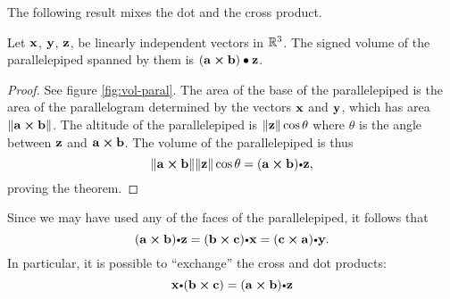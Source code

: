 The following result mixes the dot and the cross product.

\begin{thm}\label{thm:vol-parallelepiped}
Let $\mathbf{ x}$, $\mathbf{ y}$, $\mathbf{ z}$, be linearly
independent vectors in $\mathbb{R}^3$. The signed volume of the
parallelepiped spanned by them is $(\mathbf{ a}\boldsymbol\times\mathbf{ b})\bullet
\mathbf{ z}$.
\end{thm}
\begin{proof}
See figure \ref{fig:vol-paral}. The area of the base of the
parallelepiped is  the area of the parallelogram determined by the
vectors $\mathbf{ x}$ and  $\mathbf{ y}$, which has area
${\left\|\mathbf{ a}\boldsymbol\times\mathbf{ b}\right\|}$. The altitude of the parallelepiped is
${\left\|\mathbf{ z}\right\|}\cos\theta$ where $\theta$ is the angle between
$\mathbf{ z}$ and $\mathbf{ a}\boldsymbol\times\mathbf{ b}$. The volume of the
parallelepiped is thus
$$\norm{\crossprod{a}{b}}\norm{\vector{z}}\cos\theta = (\crossprod{a}{b})\bp \vector{z},  $$
proving the theorem.
\end{proof}
\begin{rem}
Since we may have used any of the faces of the parallelepiped, it
follows that
$$(\crossprod{a}{b})\bp \vector{z}= (\crossprod{b}{c})\bp \vector{x}=(\crossprod{c}{a})\bp \vector{y}.  $$
In particular, it is possible to ``exchange'' the cross and dot
products:
$$ \vector{x}\bp
(\crossprod{b}{c})=(\crossprod{a}{b})\bp \vector{z} $$
\end{rem}

